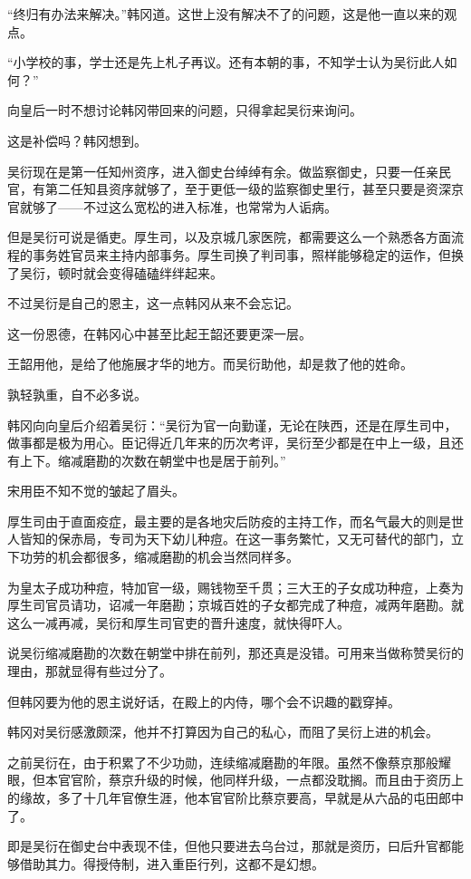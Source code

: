 “终归有办法来解决。”韩冈道。这世上没有解决不了的问题，这是他一直以来的观点。

“小学校的事，学士还是先上札子再议。还有本朝的事，不知学士认为吴衍此人如何？”

向皇后一时不想讨论韩冈带回来的问题，只得拿起吴衍来询问。

这是补偿吗？韩冈想到。

吴衍现在是第一任知州资序，进入御史台绰绰有余。做监察御史，只要一任亲民官，有第二任知县资序就够了，至于更低一级的监察御史里行，甚至只要是资深京官就够了——不过这么宽松的进入标准，也常常为人诟病。

但是吴衍可说是循吏。厚生司，以及京城几家医院，都需要这么一个熟悉各方面流程的事务姓官员来主持内部事务。厚生司换了判司事，照样能够稳定的运作，但换了吴衍，顿时就会变得磕磕绊绊起来。

不过吴衍是自己的恩主，这一点韩冈从来不会忘记。

这一份恩德，在韩冈心中甚至比起王韶还要更深一层。

王韶用他，是给了他施展才华的地方。而吴衍助他，却是救了他的姓命。

孰轻孰重，自不必多说。

韩冈向向皇后介绍着吴衍：“吴衍为官一向勤谨，无论在陕西，还是在厚生司中，做事都是极为用心。臣记得近几年来的历次考评，吴衍至少都是在中上一级，且还有上下。缩减磨勘的次数在朝堂中也是居于前列。”

宋用臣不知不觉的皱起了眉头。

厚生司由于直面疫症，最主要的是各地灾后防疫的主持工作，而名气最大的则是世人皆知的保赤局，专司为天下幼儿种痘。在这一事务繁忙，又无可替代的部门，立下功劳的机会都很多，缩减磨勘的机会当然同样多。

为皇太子成功种痘，特加官一级，赐钱物至千贯；三大王的子女成功种痘，上奏为厚生司官员请功，诏减一年磨勘；京城百姓的子女都完成了种痘，减两年磨勘。就这么一减再减，吴衍和厚生司官吏的晋升速度，就快得吓人。

说吴衍缩减磨勘的次数在朝堂中排在前列，那还真是没错。可用来当做称赞吴衍的理由，那就显得有些过分了。

但韩冈要为他的恩主说好话，在殿上的内侍，哪个会不识趣的戳穿掉。

韩冈对吴衍感激颇深，他并不打算因为自己的私心，而阻了吴衍上进的机会。

之前吴衍在，由于积累了不少功勋，连续缩减磨勘的年限。虽然不像蔡京那般耀眼，但本官官阶，蔡京升级的时候，他同样升级，一点都没耽搁。而且由于资历上的缘故，多了十几年官僚生涯，他本官官阶比蔡京要高，早就是从六品的屯田郎中了。

即是吴衍在御史台中表现不佳，但他只要进去乌台过，那就是资历，曰后升官都能够借助其力。得授侍制，进入重臣行列，这都不是幻想。

